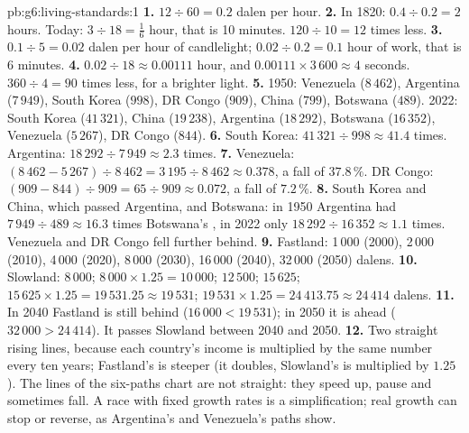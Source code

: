\begin{solution}{pb:g6:living-standards:1}
\textbf{1.} $12 \div 60 = 0.2$ dalen per hour.
\textbf{2.} In 1820: $0.4 \div 0.2 = 2$ hours. Today: $3 \div 18 = \frac{1}{6}$ hour,
that is 10 minutes. $120 \div 10 = 12$ times less.
\textbf{3.} $0.1 \div 5 = 0.02$ dalen per hour of candlelight; $0.02 \div 0.2 = 0.1$
hour of work, that is 6 minutes.
\textbf{4.} $0.02 \div 18 \approx 0.00111$ hour, and $0.00111 \times 3\,600 \approx 4$
seconds. $360 \div 4 = 90$ times less, for a brighter light.
\textbf{5.} 1950: Venezuela ($8\,462$), Argentina ($7\,949$), South Korea ($998$),
DR Congo ($909$), China ($799$), Botswana ($489$). 2022: South Korea ($41\,321$),
China ($19\,238$), Argentina ($18\,292$), Botswana ($16\,352$), Venezuela
($5\,267$), DR Congo ($844$).
\textbf{6.} South Korea: $41\,321 \div 998 \approx 41.4$ times. Argentina:
$18\,292 \div 7\,949 \approx 2.3$ times.
\textbf{7.} Venezuela: $(8\,462 - 5\,267) \div 8\,462 = 3\,195 \div 8\,462 \approx
0.378$, a fall of $37.8\,\%$. DR Congo: $(909 - 844) \div 909 = 65 \div 909 \approx
0.072$, a fall of $7.2\,\%$.
\textbf{8.} South Korea and China, which passed Argentina, and Botswana: in 1950
Argentina had $7\,949 \div 489 \approx 16.3$ times Botswana's ,
in 2022 only $18\,292 \div 16\,352 \approx 1.1$ times. Venezuela and DR Congo fell
further behind.
\textbf{9.} Fastland: 1\,000 (2000), 2\,000 (2010), 4\,000 (2020), 8\,000 (2030),
16\,000 (2040), 32\,000 (2050) dalens.
\textbf{10.} Slowland: 8\,000; $8\,000 \times 1.25 = 10\,000$; $12\,500$; $15\,625$;
$15\,625 \times 1.25 = 19\,531.25 \approx 19\,531$; $19\,531 \times 1.25 =
24\,413.75 \approx 24\,414$ dalens.
\textbf{11.} In 2040 Fastland is still behind ($16\,000 < 19\,531$); in 2050 it is
ahead ($32\,000 > 24\,414$). It passes Slowland between 2040 and 2050.
\textbf{12.} Two straight rising lines, because each country's income is
multiplied by the same number every ten years; Fastland's is steeper (it doubles,
Slowland's is multiplied by $1.25$). The lines of the six-paths chart are not
straight: they speed up, pause and sometimes fall. A race with fixed growth rates
is a simplification; real growth can stop or reverse, as Argentina's and Venezuela's
paths show.
\end{solution}
